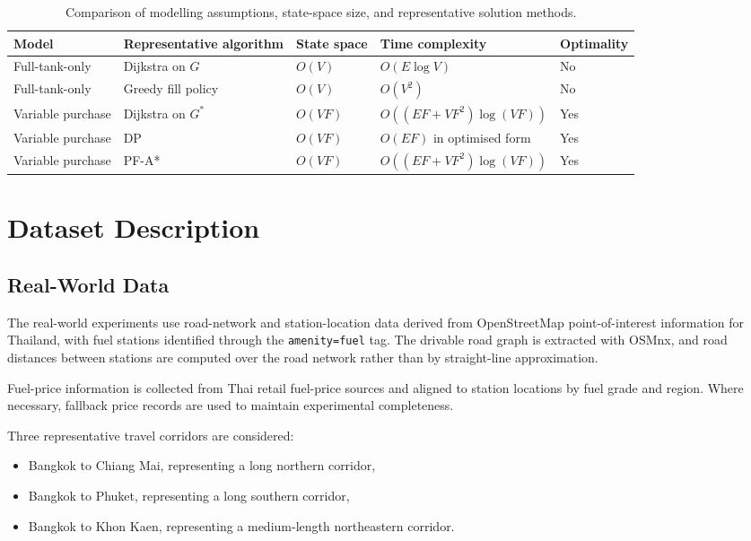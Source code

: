 \begin{table}[htbp]
\centering
\caption{Comparison of modelling assumptions, state-space size, and representative solution methods.}
\label{tab:model_comparison}
\small
\setlength{\tabcolsep}{5pt}
\renewcommand{\arraystretch}{1.15}
\begin{tabularx}{\linewidth}{@{}
>{\raggedright\arraybackslash}p{2.5cm}
>{\raggedright\arraybackslash}p{2.9cm}
>{\centering\arraybackslash}p{1.7cm}
>{\raggedright\arraybackslash}X
>{\centering\arraybackslash}p{1.6cm}
@{}}
\toprule
Model & Representative algorithm & State space & Time complexity & Optimality \\
\midrule
Full-tank-only & Dijkstra on $G$ & $O(V)$ & $O(E\log V)$ & No \\
Full-tank-only & Greedy fill policy & $O(V)$ & $O(V^{2})$ & No \\
Variable purchase & Dijkstra on $G^{*}$ & $O(VF)$ & $O((EF + VF^{2})\log(VF))$ & Yes \\
Variable purchase & DP & $O(VF)$ & $O(EF)$ in optimised form & Yes \\
Variable purchase & PF-A* & $O(VF)$ & $O((EF + VF^{2})\log(VF))$ & Yes \\
\bottomrule
\end{tabularx}
\end{table}

\section{Dataset Description}

\subsection{Real-World Data}

The real-world experiments use road-network and station-location data derived from OpenStreetMap point-of-interest information for Thailand, with fuel stations identified through the \texttt{amenity=fuel} tag. The drivable road graph is extracted with OSMnx, and road distances between stations are computed over the road network rather than by straight-line approximation.

Fuel-price information is collected from Thai retail fuel-price sources and aligned to station locations by fuel grade and region. Where necessary, fallback price records are used to maintain experimental completeness.

Three representative travel corridors are considered:
\begin{itemize}
    \item Bangkok to Chiang Mai, representing a long northern corridor,
    \item Bangkok to Phuket, representing a long southern corridor,
    \item Bangkok to Khon Kaen, representing a medium-length northeastern corridor.
\end{itemize}

